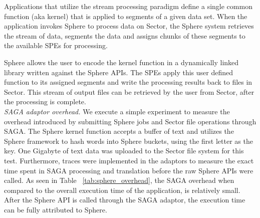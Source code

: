 \documentclass[3p,twocolumn]{elsarticle}
\begin{document}
Applications that utilize the stream processing paradigm define a
single common function (aka kernel) that is applied to segments of a
given data set.  When the application invokes Sphere to process data
on Sector, the Sphere system retrieves the stream of data, segments
the data and assigns chunks of these segments to the available SPEs
for processing.

Sphere allows the user to encode the kernel function in a dynamically
linked library written against the Sphere APIs.  The SPEs apply this
user defined function to its assigned segments and write the
processing results back to files in Sector.  This stream of output
files can be retrieved by the user from Sector, after the processing
is complete.\\


\textit{SAGA adaptor overhead.}
%
We execute a simple experiment to measure the overhead introduced by
submitting Sphere jobs and Sector file operations through SAGA.  The
Sphere kernel function accepts a buffer of text and utilizes the
Sphere framework to hash words into Sphere buckets, using the first
letter as the key. One Gigabyte of text data was uploaded to the
Sector file system for this test.   Furthermore, traces
were implemented in the adaptors to measure the exact time spent in
SAGA processing and translation before the raw Sphere APIs were
called.  As seen in Table ~\ref{tab:sphere_overhead}, the SAGA
overhead when compared to the overall execution time of the
application, is relatively small. After the Sphere API is called
through the SAGA adaptor, the execution time can be fully attributed
to Sphere.
\end{document}

